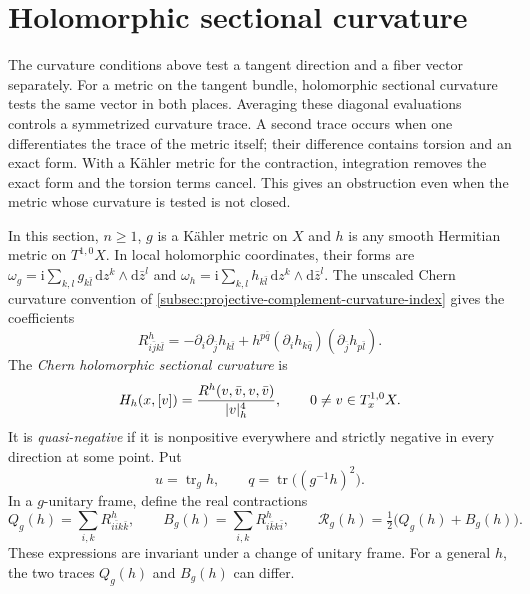 \section{Holomorphic sectional curvature}
\label{sec:integrated-hermitian-curvature}

The curvature conditions above test a tangent direction and a fiber vector separately. For a metric on the tangent bundle, holomorphic sectional curvature tests the same vector in both places. Averaging these diagonal evaluations controls a symmetrized curvature trace. A second trace occurs when one differentiates the trace of the metric itself; their difference contains torsion and an exact form. With a K\"ahler metric for the contraction, integration removes the exact form and the torsion terms cancel. This gives an obstruction even when the metric whose curvature is tested is not closed.

In this section, $n\geq1$, $g$ is a K\"ahler metric on $X$ and $h$ is any smooth Hermitian metric on $T^{1,0}X$. In local holomorphic coordinates, their forms are $\omega_g=\mathrm i\sum_{k,l}g_{k\bar l}\,\mathrm dz^k\wedge\mathrm d\bar z^l$ and $\omega_h=\mathrm i\sum_{k,l}h_{k\bar l}\,\mathrm dz^k\wedge\mathrm d\bar z^l$. The unscaled Chern curvature convention of \cref{subsec:projective-complement-curvature-index} gives the coefficients
\[
 R^h_{i\bar j k\bar l}
 =-\partial_i\partial_{\bar j}h_{k\bar l}
   +h^{p\bar q}(\partial_i h_{k\bar q})
                       (\partial_{\bar j}h_{p\bar l}).
\]
The \emph{Chern holomorphic sectional curvature} is
\begin{equation}\label{eq:chern-holomorphic-sectional-curvature}\index{Holomorphic sectional curvature!Chern connection}
 H_h(x,[v])=\frac{R^h(v,\bar v,v,\bar v)}{|v|_h^4},
 \qquad 0\ne v\in T_x^{1,0}X.
\end{equation}
It is \emph{quasi-negative} if it is nonpositive everywhere and strictly negative in every direction at some point. Put
\[
 u=\operatorname{tr}_g h,\qquad
 q=\operatorname{tr}\bigl((g^{-1}h)^2\bigr).
\]
In a $g$-unitary frame, define the real contractions
\[
 Q_g(h)=\sum_{i,k}R^h_{i\bar i k\bar k},\qquad
 B_g(h)=\sum_{i,k}R^h_{i\bar k k\bar i},\qquad
 \mathcal R_g(h)=\tfrac12\bigl(Q_g(h)+B_g(h)\bigr).
\]
These expressions are invariant under a change of unitary frame. For a general $h$, the two traces $Q_g(h)$ and $B_g(h)$ can differ.

